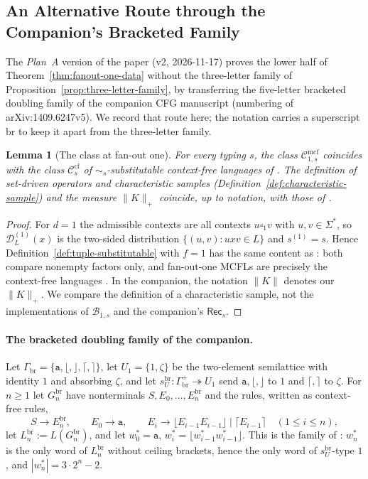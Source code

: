 \documentclass[11pt]{article}
\numberwithin{equation}{section}
\theoremstyle{plain}
\newtheorem{lemma}[theorem]{Lemma}
\theoremstyle{definition}
\theoremstyle{remark}
\newcommand{\Cmcf}[2]{\mathcal{C}^{\mathrm{mcf}}_{#1,#2}}
\newcommand{\D}{\mathcal{D}}
\newcommand{\blank}{\square}
\theoremstyle{plain}
\begin{document}
\subsection{An Alternative Route through the Companion's Bracketed Family}
\label{subsec:light-route}

The \emph{Plan~A} version of the paper (v2, 2026-11-17) proves the lower half of
Theorem~\ref{thm:fanout-one-data} without the three-letter family of
Proposition~\ref{prop:three-letter-family}, by transferring the five-letter bracketed
doubling family of the companion CFG manuscript \cite[Proposition~6.4]{kuriyamaCFG}
(numbering of arXiv:1409.6247v5).  We record that route here; the notation carries a
superscript $\mathrm{br}$ to keep it apart from the three-letter family.

\begin{lemma}[The class at fan-out one]
\label{lem:fanout-one-classes}
For every typing $s$, the class $\Cmcf{1}{s}$ coincides with the class
$\mathcal C^{\mathrm{cf}}_s$ of $\sim_s$-substitutable context-free
languages of \cite[Definition~2.1 and Section~3]{kuriyamaCFG}.
The definition of set-driven operators and characteristic samples
(Definition~\ref{def:characteristic-sample}) and the measure $\|K\|_+$
coincide, up to notation, with those of \cite[Section~2]{kuriyamaCFG}.
\end{lemma}

\begin{proof}
For $d=1$ the admissible contexts are all contexts
$u\blank_1v$ with $u,v\in\Sigma^*$, so $\D^{(1)}_L(x)$ is the two-sided
distribution $\{(u,v):uxv\in L\}$ and $s^{(1)}=s$.  Hence Definition~\ref{def:tuple-substitutable} with $f=1$ has the
same content as \cite[Definition~2.1]{kuriyamaCFG}: both compare
nonempty factors only, and fan-out-one MCFLs are precisely the
context-free languages \cite{SekiEtAl1991}.  In the companion,
the notation $\|K\|$ denotes our $\|K\|_+$.
We compare the definition of a characteristic sample, not the
implementations of $\mathcal B_{1,s}$ and the companion's
$\mathsf{Rec}_s$.
\end{proof}

\paragraph{The bracketed doubling family of the companion.}
Let $\Gamma_{\mathrm{br}}=\{\mathtt a,\lfloor,\rfloor,\lceil,\rceil\}$,
let $U_1=\{1,\zeta\}$ be the two-element semilattice with identity
$1$ and absorbing $\zeta$, and let
$s^{\mathrm{br}}_U:\Gamma_{\mathrm{br}}^+\twoheadrightarrow U_1$ send
$\mathtt a,\lfloor,\rfloor$ to $1$ and $\lceil,\rceil$ to $\zeta$.  For
$n\ge1$ let $G^{\mathrm{br}}_n$ have nonterminals $S,E_0,\ldots,E^{\mathrm{br}}_n$ and the rules,
written as context-free rules,
\[
 S\to E^{\mathrm{br}}_n,\qquad E_0\to\mathtt a,\qquad
 E_i\to\lfloor E_{i-1}E_{i-1}\rfloor\mid\lceil E_{i-1}\rceil
 \quad(1\le i\le n),
\]
let $L^{\mathrm{br}}_n:=L(G^{\mathrm{br}}_n)$, and let $w^*_0=\mathtt a$,
$w^*_i=\lfloor w^*_{i-1}w^*_{i-1}\rfloor$.  This is the family of
\cite[Section~6]{kuriyamaCFG}: $w^*_n$ is the only word of $L^{\mathrm{br}}_n$ without
ceiling brackets, hence the only word of $s^{\mathrm{br}}_U$-type $1$, and
$|w^*_n|=3\cdot2^n-2$.
\end{document}
